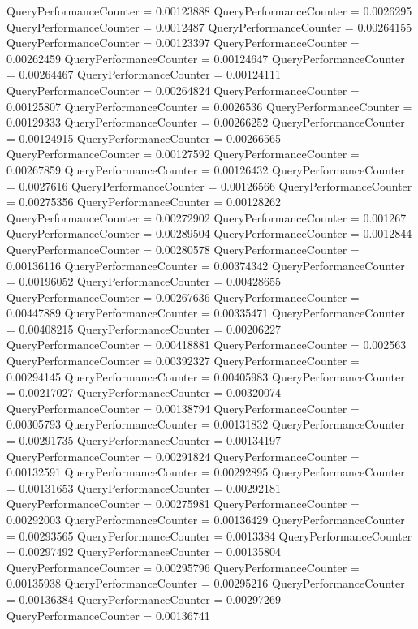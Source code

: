 \documentclass[9pt]{article}
\theoremstyle{plain}
\theoremstyle{definition}
\theoremstyle{remark}
\numberwithin{equation}{section}
\begin{document}
QueryPerformanceCounter  =  0.00123888
QueryPerformanceCounter  =  0.0026295
QueryPerformanceCounter  =  0.0012487
QueryPerformanceCounter  =  0.00264155
QueryPerformanceCounter  =  0.00123397
QueryPerformanceCounter  =  0.00262459
QueryPerformanceCounter  =  0.00124647
QueryPerformanceCounter  =  0.00264467
QueryPerformanceCounter  =  0.00124111
QueryPerformanceCounter  =  0.00264824
QueryPerformanceCounter  =  0.00125807
QueryPerformanceCounter  =  0.0026536
QueryPerformanceCounter  =  0.00129333
QueryPerformanceCounter  =  0.00266252
QueryPerformanceCounter  =  0.00124915
QueryPerformanceCounter  =  0.00266565
QueryPerformanceCounter  =  0.00127592
QueryPerformanceCounter  =  0.00267859
QueryPerformanceCounter  =  0.00126432
QueryPerformanceCounter  =  0.0027616
QueryPerformanceCounter  =  0.00126566
QueryPerformanceCounter  =  0.00275356
QueryPerformanceCounter  =  0.00128262
QueryPerformanceCounter  =  0.00272902
QueryPerformanceCounter  =  0.001267
QueryPerformanceCounter  =  0.00289504
QueryPerformanceCounter  =  0.0012844
QueryPerformanceCounter  =  0.00280578
QueryPerformanceCounter  =  0.00136116
QueryPerformanceCounter  =  0.00374342
QueryPerformanceCounter  =  0.00196052
QueryPerformanceCounter  =  0.00428655
QueryPerformanceCounter  =  0.00267636
QueryPerformanceCounter  =  0.00447889
QueryPerformanceCounter  =  0.00335471
QueryPerformanceCounter  =  0.00408215
QueryPerformanceCounter  =  0.00206227
QueryPerformanceCounter  =  0.00418881
QueryPerformanceCounter  =  0.002563
QueryPerformanceCounter  =  0.00392327
QueryPerformanceCounter  =  0.00294145
QueryPerformanceCounter  =  0.00405983
QueryPerformanceCounter  =  0.00217027
QueryPerformanceCounter  =  0.00320074
QueryPerformanceCounter  =  0.00138794
QueryPerformanceCounter  =  0.00305793
QueryPerformanceCounter  =  0.00131832
QueryPerformanceCounter  =  0.00291735
QueryPerformanceCounter  =  0.00134197
QueryPerformanceCounter  =  0.00291824
QueryPerformanceCounter  =  0.00132591
QueryPerformanceCounter  =  0.00292895
QueryPerformanceCounter  =  0.00131653
QueryPerformanceCounter  =  0.00292181
QueryPerformanceCounter  =  0.00275981
QueryPerformanceCounter  =  0.00292003
QueryPerformanceCounter  =  0.00136429
QueryPerformanceCounter  =  0.00293565
QueryPerformanceCounter  =  0.0013384
QueryPerformanceCounter  =  0.00297492
QueryPerformanceCounter  =  0.00135804
QueryPerformanceCounter  =  0.00295796
QueryPerformanceCounter  =  0.00135938
QueryPerformanceCounter  =  0.00295216
QueryPerformanceCounter  =  0.00136384
QueryPerformanceCounter  =  0.00297269
QueryPerformanceCounter  =  0.00136741
\end{document}
